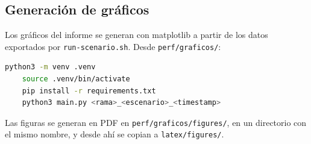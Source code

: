     \subsection{Generación de gráficos}
    \label{sec:consideraciones_graficos}

        Los gráficos del informe se generan con matplotlib a partir de los datos exportados por \texttt{run-scenario.sh}.
        Desde \texttt{perf/graficos/}:

\begin{lstlisting}[language=bash]
    python3 -m venv .venv
    source .venv/bin/activate
    pip install -r requirements.txt
    python3 main.py <rama>_<escenario>_<timestamp>
\end{lstlisting}

        Las figuras se generan en PDF en \texttt{perf/graficos/figures/}, en un directorio con el mismo nombre, y desde ahí se copian a \texttt{latex/figures/}.
